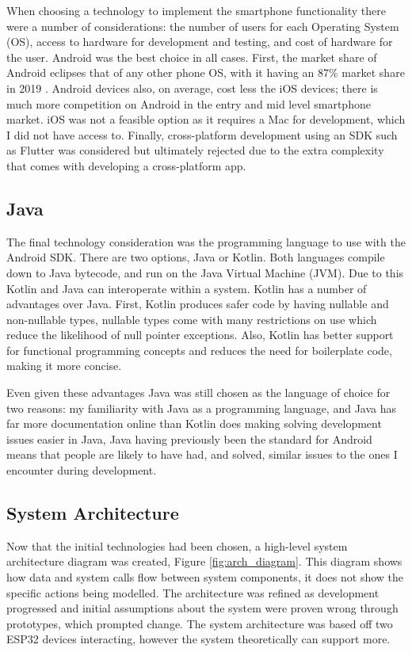\documentclass{l4proj}
\begin{document}
When choosing a technology to implement the smartphone functionality there were a number of considerations: the number of users for each Operating System (OS), access to hardware for development and testing, and cost of hardware for the user. Android was the best choice in all cases. First, the market share of Android eclipses that of any other phone OS, with it having an 87\% market share in 2019 \citep{cohen_ios_2020}. Android devices also, on average, cost less the iOS devices; there is much more competition on Android in the entry and mid level smartphone market. iOS was not a feasible option as it requires a Mac for development, which I did not have access to. Finally, cross-platform development using an SDK such as Flutter was considered but ultimately rejected due to the extra complexity that comes with developing a cross-platform app.

\subsection{Java}

The final technology consideration was the programming language to use with the Android SDK. There are two options, Java or Kotlin. Both languages compile down to Java bytecode, and run on the Java Virtual Machine (JVM). Due to this Kotlin and Java can interoperate within a system. Kotlin has a number of advantages over Java. First, Kotlin produces safer code by having nullable and non-nullable types, nullable types come with many restrictions on use which reduce the likelihood of null pointer exceptions. Also, Kotlin has better support for functional programming concepts and reduces the need for boilerplate code, making it more concise.

Even given these advantages Java was still chosen as the language of choice for two reasons: my familiarity with Java as a programming language, and Java has far more documentation online than Kotlin does making solving development issues easier in Java, Java having previously been the standard for Android means that people are likely to have had, and solved, similar issues to the ones I encounter during development.

\subsection{System Architecture}

Now that the initial technologies had been chosen, a high-level system architecture diagram was created, Figure \ref{fig:arch_diagram}. This diagram shows how data and system calls flow between system components, it does not show the specific actions being modelled. The architecture was refined as development progressed and initial assumptions about the system were proven wrong through prototypes, which prompted change. The system architecture was based off two ESP32 devices interacting, however the system theoretically can support more.
\end{document}
